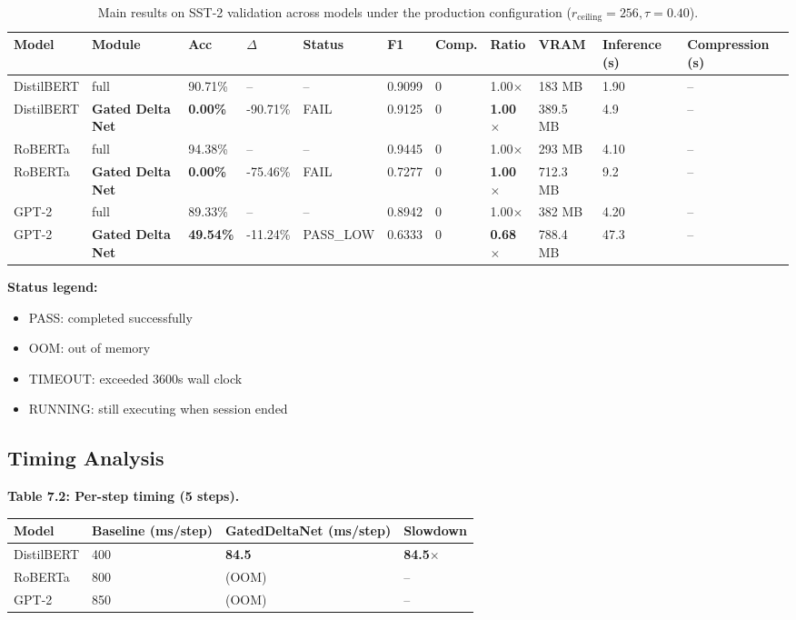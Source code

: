 \begin{table}[t]
\centering
\small
\begin{tabular}{lllllllllll}
\toprule
\textbf{Model} & \textbf{Module} & \textbf{Acc} & \textbf{$\Delta$} & \textbf{Status} & \textbf{F1} & \textbf{Comp.} & \textbf{Ratio} & \textbf{VRAM} & \textbf{Inference (s)} & \textbf{Compression (s)} \\
\midrule
DistilBERT & full & 90.71\% & -- & -- & 0.9099 & 0 & 1.00$\times$ & 183 MB & 1.90 & -- \\
DistilBERT & \textbf{Gated Delta Net} & \textbf{0.00\%} & -90.71\% & FAIL & 0.9125 & 0 & \textbf{1.00$\times$} & 389.5 MB & 4.9 & -- \\
RoBERTa & full & 94.38\% & -- & -- & 0.9445 & 0 & 1.00$\times$ & 293 MB & 4.10 & -- \\
RoBERTa & \textbf{Gated Delta Net} & \textbf{0.00\%} & -75.46\% & FAIL & 0.7277 & 0 & \textbf{1.00$\times$} & 712.3 MB & 9.2 & -- \\
GPT-2 & full & 89.33\% & -- & -- & 0.8942 & 0 & 1.00$\times$ & 382 MB & 4.20 & -- \\
GPT-2 & \textbf{Gated Delta Net} & \textbf{49.54\%} & -11.24\% & PASS\_LOW & 0.6333 & 0 & \textbf{0.68$\times$} & 788.4 MB & 47.3 & -- \\
\bottomrule
\end{tabular}
\caption{Main results on SST-2 validation across models under the production configuration ($r_{\mathrm{ceiling}}=256, \tau=0.40$).}
\label{tab:main_sst2}
\end{table}

\textbf{Status legend:}
\begin{itemize}
\item PASS: completed successfully
\item OOM: out of memory
\item TIMEOUT: exceeded 3600s wall clock
\item RUNNING: still executing when session ended

\end{itemize}
\subsection{Timing Analysis}

\textbf{Table 7.2: Per-step timing (5 steps).}

\begin{table}[H]
\centering
\small
\begin{tabular}{llll}
\toprule
\textbf{Model} & \textbf{Baseline (ms/step)} & \textbf{GatedDeltaNet (ms/step)} & \textbf{Slowdown} \\
\midrule
DistilBERT & 400 & \textbf{84.5} & \textbf{84.5$\times$} \\
RoBERTa & 800 & (OOM) & -- \\
GPT-2 & 850 & (OOM) & -- \\
\bottomrule
\end{tabular}
\end{table}

